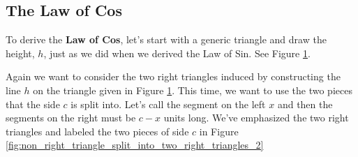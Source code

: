 
\newpage

\subsection*{The Law of Cos}
\label{sub_sec:the_law_of_cos}

To derive the \textbf{Law of Cos}, let's start with a generic triangle and draw
the height, $h$, just as we did when we derived the Law of Sin. See Figure
\ref{fig:non_right_triangle_3}.

\begin{figure}[htpb]
	\centering


	\caption{}
	\label{fig:non_right_triangle_3}
\end{figure}

Again we want to consider the two right triangles induced by constructing the
line $h$ on the triangle given in Figure \ref{fig:non_right_triangle_3}. This
time, we want to use the two pieces that the side $c$ is split into. Let's call
the segment on the left $x$ and then the segments on the right must be $c - x$
units long. We've emphasized the two right triangles and labeled the two pieces
of side $c$ in Figure
\ref{fig:non_right_triangle_split_into_two_right_triangles_2}

